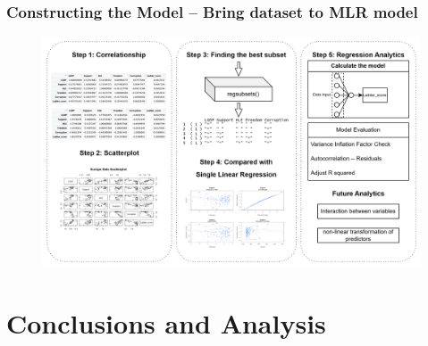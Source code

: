 \documentclass{beamer}
\begin{document}
\begin{frame}
  \frametitle{Constructing the Model -- Bring dataset to MLR model}
  \begin{figure}
    \includegraphics[width=\textwidth]{img/UsingMLR.png}
  \end{figure}
\end{frame}
% 
% 
% 
% 
% 
% 
% 
% 
% 
% 
\section{Conclusions and Analysis}
% 
% 
% 
% 
\end{document}
